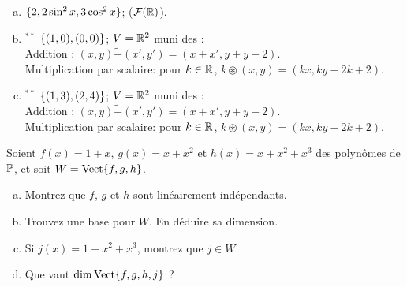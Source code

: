 \begin{prob}
\begin{enumerate}[(a)]
\item  $\set{2, 2\sin^2 x,  3\cos^2 x}$; ($\F(\R)$). \medskip  

\item$^{\ast\ast}$ $\set{(1,0), (0,0)}$; $ V=\R^2$  muni des  :\\ 
Addition : $(x,y) \tilde+ (x',y')=(x+x', y+y-2)$.\\
Multiplication par scalaire: pour $k\in \R$, $k\circledast (x,y)=(kx, ky-2k+2)$.     \medskip

\item$^{\ast\ast}$ $\set{(1,3), (2,4)}$; $ V=\R^2$ muni des  :\\ 
Addition : $(x,y) \tilde+ (x',y')=(x+x', y+y-2)$.\\ 
Multiplication par scalaire: pour $k\in \R$, $k\circledast (x,y)=(kx, ky-2k+2)$.     \medskip

\end{enumerate}
 

\end{prob} \begin{prob} \label{prob09.3}
Soient $f(x) =1+x$, $g(x) = x+ x^2$ et $h(x) = x+ x^2 + x^3$ des polynômes de $\PP$, et soit 
$W=\sp{f,g,h}$.
\smallskip
\begin{enumerate}[(a)]
\item Montrez que $f$, $g$ et $h$ sont linéairement indépendants. 
\item Trouvez une base pour $W$. En d\'eduire sa dimension.
\smallskip
\item Si $j(x) = 1-x^2 +x^3$, montrez que $j \in W$.
\item Que vaut $\dim \sp{f,g,h,j}$ ?
\end{enumerate}
\end{prob} 

